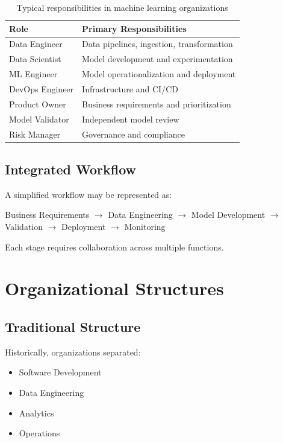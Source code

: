 \begin{table}[h]
\centering
\begin{tabular}{p{4cm}p{8cm}}
\toprule
Role & Primary Responsibilities \\
\midrule
Data Engineer & Data pipelines, ingestion, transformation \\
Data Scientist & Model development and experimentation \\
ML Engineer & Model operationalization and deployment \\
DevOps Engineer & Infrastructure and CI/CD \\
Product Owner & Business requirements and prioritization \\
Model Validator & Independent model review \\
Risk Manager & Governance and compliance \\
\bottomrule
\end{tabular}
\caption{Typical responsibilities in machine learning organizations}
\end{table}

\subsection{Integrated Workflow}

A simplified workflow may be represented as:

\begin{center}
Business Requirements
$\rightarrow$
Data Engineering
$\rightarrow$
Model Development
$\rightarrow$
Validation
$\rightarrow$
Deployment
$\rightarrow$
Monitoring
\end{center}

Each stage requires collaboration across multiple functions.

\section{Organizational Structures}

\subsection{Traditional Structure}

Historically, organizations separated:

\begin{itemize}
    \item Software Development
    \item Data Engineering
    \item Analytics
    \item Operations
\end{itemize}

